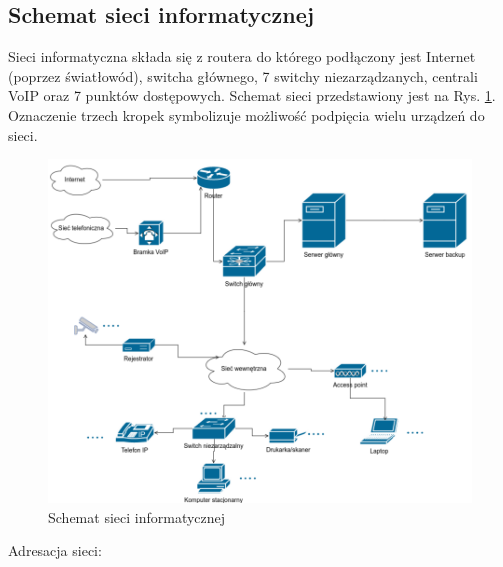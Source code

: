 \newpage
\subsection{Schemat sieci informatycznej}
Sieci informatyczna składa się z routera do którego podłączony jest \linebreak Internet (poprzez światłowód), switcha głównego, 7 switchy niezarządzanych, centrali VoIP oraz 7 punktów dostępowych. Schemat sieci przedstawiony jest na Rys. \ref{schemat:schemat_sieci_infor}. Oznaczenie trzech kropek symbolizuje możliwość podpięcia wielu urządzeń do sieci.

\begin{figure}[!h]
	\includegraphics[width=15cm]{Schemat_sieci.png}
	\caption{Schemat sieci informatycznej}
	\label{schemat:schemat_sieci_infor}
\end{figure}

\newpage
Adresacja sieci:

